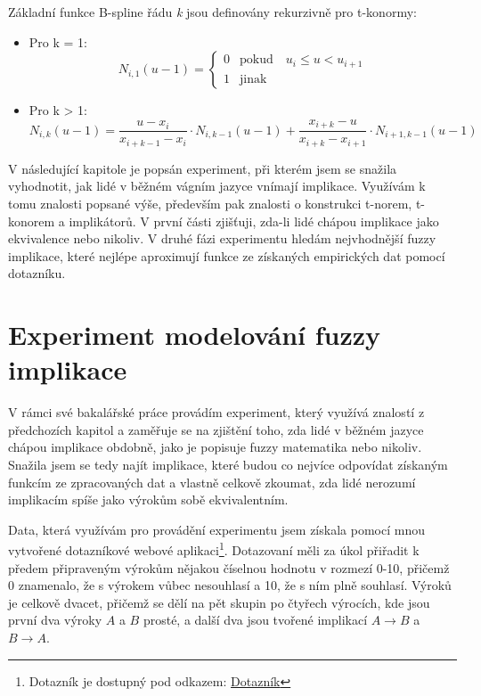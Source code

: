 Základní funkce B-spline řádu \textit{k} jsou definovány rekurzivně pro t-konormy: \\
\begin{itemize}
    \item Pro k = 1:
\[
N_{i,1}(u-1) = 
\begin{cases}
    0 & \text{pokud} \quad u_i \leq u < u_{i+1} \\
    1 & \text{jinak}
\end{cases}
\]

 \item Pro k > 1:
\[
N_{i,k}(u-1) = \frac{u - x_i}{x_{i + k - 1} - x_i} \cdot N_{i, k - 1}(u-1)
+ \frac{x_{i + k} - u}{x_{i + k} - x_{i + 1}} \cdot N_{i + 1, k - 1}(u-1)
\]
\end{itemize}



V následující kapitole je popsán experiment, při kterém jsem se snažila vyhodnotit, jak lidé v běžném vágním jazyce vnímají implikace. Využívám k tomu znalosti popsané výše, především pak znalosti o konstrukci t-norem, t-konorem a implikátorů. V 
první části zjišťuji, zda-li lidé chápou implikace jako ekvivalence nebo nikoliv. V druhé fázi experimentu hledám nejvhodnější fuzzy implikace, které  nejlépe aproximují funkce ze získaných empirických dat pomocí dotazníku.



\section{Experiment modelování fuzzy implikace}
V rámci své bakalářské práce provádím experiment, který využívá znalostí z předchozích kapitol a zaměřuje se na zjištění toho, zda lidé v běžném jazyce chápou implikace obdobně, jako je popisuje fuzzy matematika nebo nikoliv. Snažila jsem se tedy najít implikace, které budou co nejvíce odpovídat získaným funkcím ze zpracovaných dat a vlastně celkově zkoumat, zda lidé nerozumí implikacím spíše jako výrok\r um sobě ekvivalentním.

Data, která využívám pro provádění experimentu jsem získala pomocí mnou vytvořené dotazníkové webové aplikaci\footnote{Dotazník je dostupný pod odkazem: \href{https://www.stud.fit.vutbr.cz/~xjirmu00/bp/}{Dotazník}}. Dotazovaní měli za \' ukol přiřadit k předem připraveným výrok\r um nějakou číselnou hodnotu v rozmezí 0-10, přičemž 0 znamenalo, že s výrokem v\r ubec nesouhlasí a 10, že s ním plně souhlasí. Výrok\r u je celkově dvacet, přičemž se dělí na pět skupin po čtyřech výrocích, kde jsou první dva výroky $A$ a $B$ prosté, a další dva jsou tvořené implikací $A \to B$ a $B \to A$.

